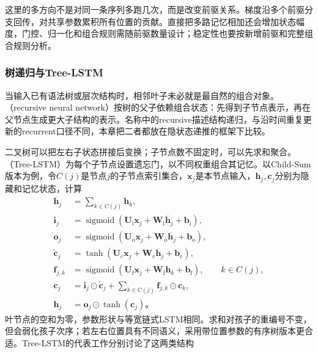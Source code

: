 这里的多方向不是对同一条序列多跑几次，而是改变前驱关系。梯度沿多个前驱分支回传，对共享参数累积所有位置的贡献。直接把多路记忆相加还会增加状态幅度，门控、归一化和组合规则需随前驱数量设计；稳定性也要按新增前驱和完整组合规则分析。

\subsubsection{树递归与Tree-LSTM}
\label{sec:rnn-tree}

当输入已有语法树或层次结构时，相邻叶子未必就是最自然的组合对象。（recursive neural network）按树的父子依赖组合状态：先得到子节点表示，再在父节点生成更大子结构的表示。名称中的recursive描述结构递归，与沿时间重复更新的recurrent口径不同，本章把二者都放在隐状态递推的框架下比较。

二叉树可以把左右子状态拼接后变换；子节点数不固定时，可以先求和聚合。（Tree-LSTM）为每个子节点设置遗忘门，以不同权重组合其记忆。以Child-Sum版本为例，令$C(j)$是节点$j$的子节点索引集合，$\bm{x}_j$是本节点输入，$\bm{h}_j,\bm{c}_j$分别为隐藏和记忆状态，计算
\begin{equation}
  \begin{aligned}
    \overline{\bm{h}}_j&=\sum_{k\in C(j)}\bm{h}_k,\\
    \bm{i}_j&=\operatorname{sigmoid}\!\left(
       \bm{U}_{\mathrm{i}}\bm{x}_j+\bm{W}_{\mathrm{i}}\overline{\bm{h}}_j
       +\bm{b}_{\mathrm{i}}\right),\\
    \bm{o}_j&=\operatorname{sigmoid}\!\left(
       \bm{U}_{\mathrm{o}}\bm{x}_j+\bm{W}_{\mathrm{o}}\overline{\bm{h}}_j
       +\bm{b}_{\mathrm{o}}\right),\\
    \widetilde{\bm{c}}_j&=\tanh\!\left(
       \bm{U}_{\mathrm{c}}\bm{x}_j+\bm{W}_{\mathrm{c}}\overline{\bm{h}}_j
       +\bm{b}_{\mathrm{c}}\right),\\
    \bm{f}_{j,k}&=\operatorname{sigmoid}\!\left(
       \bm{U}_{\mathrm{f}}\bm{x}_j+\bm{W}_{\mathrm{f}}\bm{h}_k
       +\bm{b}_{\mathrm{f}}\right),\qquad k\in C(j),\\
    \bm{c}_j&=\bm{i}_j\odot\widetilde{\bm{c}}_j
        +\sum_{k\in C(j)}\bm{f}_{j,k}\odot\bm{c}_k,\\
    \bm{h}_j&=\bm{o}_j\odot\tanh(\bm{c}_j)\text{。}
  \end{aligned}
  \label{eq:rnn-tree-lstm}
\end{equation}
叶节点的空和为零，参数形状与等宽链式LSTM相同。求和对孩子的重编号不变，但会弱化孩子次序；若左右位置具有不同语义，采用带位置参数的有序树版本更合适。Tree-LSTM的代表工作分别讨论了这两类结构

